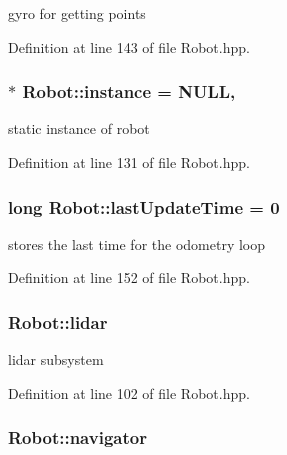 gyro for getting points 



Definition at line 143 of file Robot.\-hpp.

\hypertarget{classRobot_aad5c5d6db601aac62393d47ec9385fa3}{
\subsubsection[{instance}]{ $\ast$ Robot\-::instance = N\-U\-L\-L\hspace{0.3cm}{\ttfamily [static]}, {\ttfamily [private]}}}\label{classRobot_aad5c5d6db601aac62393d47ec9385fa3}


static instance of robot 



Definition at line 131 of file Robot.\-hpp.

\hypertarget{classRobot_a82a33c66efce935d2cac37c9f11c6efd}{
\subsubsection[{last\-Update\-Time}]{\setlength{\rightskip}{0pt plus 5cm}long Robot\-::last\-Update\-Time = 0\hspace{0.3cm}{\ttfamily [private]}}}\label{classRobot_a82a33c66efce935d2cac37c9f11c6efd}


stores the last time for the odometry loop 



Definition at line 152 of file Robot.\-hpp.

\hypertarget{classRobot_a222e54f477e23f5af80cfa10bcd85e7a}{
\subsubsection[{lidar}]{ Robot\-::lidar}}\label{classRobot_a222e54f477e23f5af80cfa10bcd85e7a}


lidar subsystem 



Definition at line 102 of file Robot.\-hpp.

\hypertarget{classRobot_a71e296a4f32c3a81b5a9fabeac12747b}{
\subsubsection[{navigator}]{ Robot\-::navigator}}\label{classRobot_a71e296a4f32c3a81b5a9fabeac12747b}


